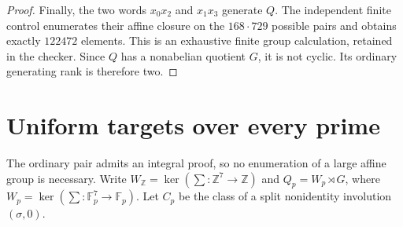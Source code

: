 \documentclass[11pt]{article}
\newcommand{\F}{\mathbb F}
\begin{document}
\begin{proof}
Finally, the two words $x_0x_2$ and $x_1x_3$ generate $Q$.
The independent finite control enumerates their affine closure on the
$168\cdot729$ possible pairs and obtains exactly $122472$ elements.
This is an exhaustive finite group calculation, retained in the
checker. Since $Q$ has a nonabelian quotient $G$, it is not cyclic.
Its ordinary generating rank is therefore two.
\end{proof}

\section{Uniform targets over every prime}

The ordinary pair admits an integral proof, so no enumeration of a
large affine group is necessary. Write $W_{\mathbb Z}=\ker(\sum:
\mathbb Z^7\to\mathbb Z)$ and $Q_p=W_p\rtimes G$, where
$W_p=\ker(\sum:\F_p^7\to\F_p)$. Let $C_p$ be the class of a split
nonidentity involution $(\sigma,0)$.
\end{document}
